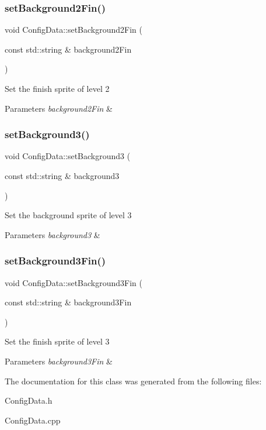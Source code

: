 \subsubsection{\texorpdfstring{set\+Background2\+Fin()}{setBackground2Fin()}}
{\footnotesize\ttfamily void Config\+Data\+::set\+Background2\+Fin (\begin{DoxyParamCaption}\item[{const std\+::string \&}]{background2\+Fin }\end{DoxyParamCaption})}

Set the finish sprite of level 2 
\begin{DoxyParams}{Parameters}
{\em background2\+Fin} & \\
\hline
\end{DoxyParams}
\mbox{\label{classConfigData_a339eecd0d675c97642969024a2ab4ff5}} 
\subsubsection{\texorpdfstring{set\+Background3()}{setBackground3()}}
{\footnotesize\ttfamily void Config\+Data\+::set\+Background3 (\begin{DoxyParamCaption}\item[{const std\+::string \&}]{background3 }\end{DoxyParamCaption})}

Set the background sprite of level 3 
\begin{DoxyParams}{Parameters}
{\em background3} & \\
\hline
\end{DoxyParams}
\mbox{\label{classConfigData_ad2b64a90240c5f3d3b84f398c339a6b7}} 
\subsubsection{\texorpdfstring{set\+Background3\+Fin()}{setBackground3Fin()}}
{\footnotesize\ttfamily void Config\+Data\+::set\+Background3\+Fin (\begin{DoxyParamCaption}\item[{const std\+::string \&}]{background3\+Fin }\end{DoxyParamCaption})}

Set the finish sprite of level 3 
\begin{DoxyParams}{Parameters}
{\em background3\+Fin} & \\
\hline
\end{DoxyParams}


The documentation for this class was generated from the following files\+:\begin{DoxyCompactItemize}
\item 
Config\+Data.\+h\item 
Config\+Data.\+cpp\end{DoxyCompactItemize}
